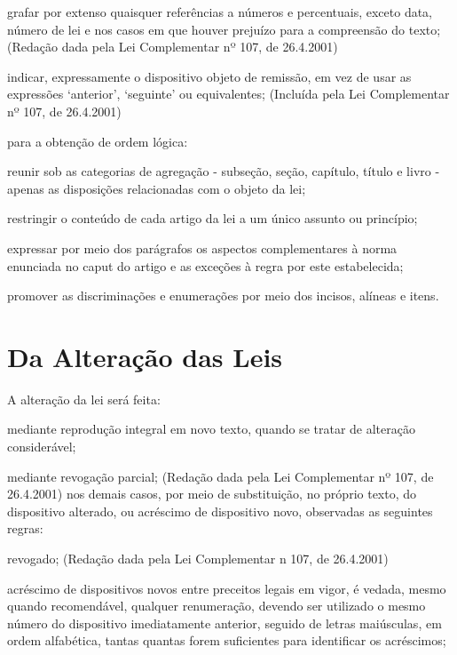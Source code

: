 \documentclass[a5paper,capitulo,titlepage=false]{br-lex}
\begin{document}

\alinea grafar por extenso quaisquer referências a números e percentuais, exceto data, número de lei e nos casos em que houver prejuízo para a compreensão do texto;     (Redação dada pela Lei Complementar nº 107, de 26.4.2001)

\alinea indicar, expressamente o dispositivo objeto de remissão, em vez de usar as expressões ‘anterior’, ‘seguinte’ ou equivalentes;     (Incluída pela Lei Complementar nº 107, de 26.4.2001)

\inciso para a obtenção de ordem lógica:

\alinea reunir sob as categorias de agregação - subseção, seção, capítulo, título e livro - apenas as disposições relacionadas com o objeto da lei;

\alinea restringir o conteúdo de cada artigo da lei a um único assunto ou princípio;

\alinea expressar por meio dos parágrafos os aspectos complementares à norma enunciada no caput do artigo e as exceções à regra por este estabelecida;

\alinea promover as discriminações e enumerações por meio dos incisos, alíneas e itens.

\section{Da Alteração das Leis}

\artigo A alteração da lei será feita:


\inciso  mediante reprodução integral em novo texto, quando se tratar de alteração considerável;

\inciso  mediante revogação parcial;    (Redação dada pela Lei Complementar nº 107, de 26.4.2001)
\inciso nos demais casos, por meio de substituição, no próprio texto, do dispositivo alterado, ou acréscimo de dispositivo novo, observadas as seguintes regras:


\alinea  revogado; (Redação dada pela Lei Complementar n 107, de 26.4.2001)


\alinea  acréscimo de dispositivos novos entre preceitos legais em vigor, é vedada, mesmo quando recomendável, qualquer renumeração, devendo ser utilizado o mesmo número do dispositivo imediatamente anterior, seguido de letras maiúsculas, em ordem alfabética, tantas quantas forem suficientes para identificar os acréscimos;
\end{document}
